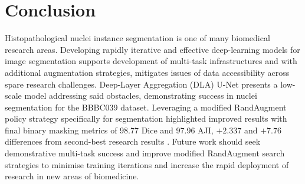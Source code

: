 \section{Conclusion}

Histopathological nuclei instance segmentation is one of many biomedical research areas. Developing rapidly iterative and effective deep-learning models for image segmentation supports development of multi-task infrastructures and with additional augmentation strategies, mitigates issues of data accessibility across spare research challenges. Deep-Layer Aggregation (DLA) U-Net presents a low-scale model addressing said obstacles, demonstrating success in nuclei segmentation for the BBBC039 dataset. Leveraging a modified RandAugment policy strategy specifically for segmentation highlighted improved results with final binary masking metrics of 98.77 Dice and 97.96 AJI, $+2.337$ and $+7.76$ differences from second-best research results \cite{BBBC039ResearchStudy}. Future work should seek demonstrative multi-task success and improve modified RandAugment search strategies to minimise training iterations and increase the rapid deployment of research in new areas of biomedicine.
